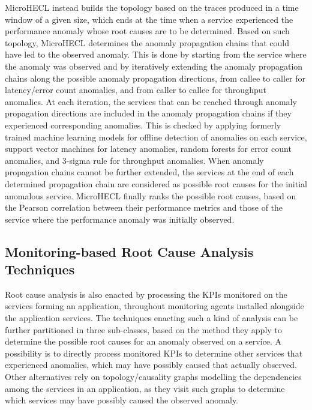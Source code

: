 MicroHECL \cite{47_Liu2021_MicroHECL} instead builds the topology based on the traces produced in a time window of a given size, which ends at the time when a service experienced the performance anomaly whose root causes are to be determined.
Based on such topology, MicroHECL \cite{47_Liu2021_MicroHECL} determines the anomaly propagation chains that could have led to the observed anomaly.
This is done by starting from the service where the anomaly was observed and by iteratively extending the anomaly propagation chains along the possible anomaly propagation directions, \viz from callee to caller for latency/error count anomalies, and from caller to callee for throughput anomalies. 
At each iteration, the services that can be reached through anomaly propagation directions are included in the anomaly propagation chains if they experienced corresponding anomalies. 
This is checked by applying formerly trained machine learning models for offline detection of anomalies on each service, \viz support vector machines \cite{Scholkopf1999_SupportVectorLearning} for latency anomalies, random forests \cite{Breiman2001_RandomForests} for error count anomalies, and 3-sigma rule  \cite{Chandola2009_SurveyAnomalyDetection} for throughput anomalies. 
When anomaly propagation chains cannot be further extended, the services at the end of each determined propagation chain are considered as possible root causes for the initial anomalous service.
MicroHECL \cite{47_Liu2021_MicroHECL} finally ranks the possible root causes, based on the Pearson correlation between their performance metrics and those of the service where the performance anomaly was initially observed.

\subsection{Monitoring-based Root Cause Analysis Techniques}
\label{sec:rca:monitoring}
Root cause analysis is also enacted by processing the KPIs monitored on the services forming an application, throughout monitoring agents installed alongside the application services.
The techniques enacting such a kind of analysis can be further partitioned in three sub-classes, based on the method they apply to determine the possible root causes for an anomaly observed on a service.
A possibility is to 
{%
directly process monitored KPIs to determine other services that experienced anomalies, which may have possibly caused that actually observed.
}
Other alternatives rely on topology/causality graphs modelling the dependencies among the services in an application, as they visit such graphs to determine which services may have possibly caused the observed anomaly.

